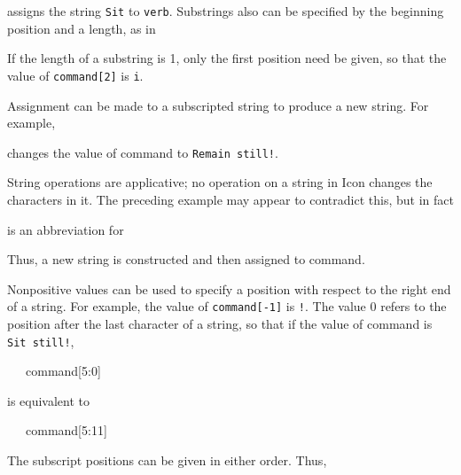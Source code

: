 

\noindent assigns the string
\texttt{{\textquotedbl}Sit{\textquotedbl}} to
\texttt{verb}. Substrings also can be specified by the beginning
position and a length, as in



If the length of a substring is 1, only the first position need be
given, so that the value of \texttt{command[2]} is
\texttt{{\textquotedbl}i{\textquotedbl}}.

Assignment can be made to a subscripted string to produce a new
string. For example,



\noindent changes the value of command to
\texttt{{\textquotedbl}Remain still!{\textquotedbl}}.

String operations are applicative; no operation on a string in Icon
changes the characters in it. The preceding example may appear to
contradict this, but in fact



\noindent
is an abbreviation for



Thus, a new string is constructed and then assigned to command.

Nonpositive values can be used to specify a position with respect to
the right end of a string. For example, the value of
\texttt{command[-1]} is \texttt{{\textquotedbl}!{\textquotedbl}}. The
value 0 refers to the position after the last character of a string,
so that if the value of command is \texttt{{\textquotedbl}Sit
still!{\textquotedbl}},


\ \ \ command[5:0]


\noindent is equivalent to


\ \ \ command[5:11]


The subscript positions can be given in either order. Thus,




